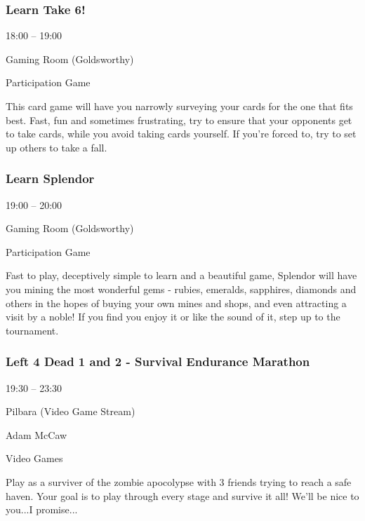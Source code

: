 \documentclass{scrreprt}
\begin{document}
\begin{multicols}{2}
\subsubsection*{Learn Take 6!}\begin{description}
\setlength{\itemsep}{0pt}
\setlength{\parsep}{0pt}
\setlength{\parskip}{0pt}
\item[Time:]{18:00 -- 19:00}
\item[Venue:]{Gaming Room (Goldsworthy)}
\item[Tags:]{Participation Game}\end{description}
This card game will have you narrowly surveying your cards for the one that fits best. Fast, fun and sometimes frustrating, try to ensure that your opponents get to take cards, while you avoid taking cards yourself. If you're forced to, try to set up others to take a fall.
\subsubsection*{Learn Splendor}\begin{description}
\setlength{\itemsep}{0pt}
\setlength{\parsep}{0pt}
\setlength{\parskip}{0pt}
\item[Time:]{19:00 -- 20:00}
\item[Venue:]{Gaming Room (Goldsworthy)}
\item[Tags:]{Participation Game}\end{description}
Fast to play, deceptively simple to learn and a beautiful game, Splendor will have you mining the most wonderful gems - rubies, emeralds, sapphires, diamonds and others in the hopes of buying your own mines and shops, and even attracting a visit by a noble! If you find you enjoy it or like the sound of it, step up to the tournament.
\subsubsection*{Left 4 Dead 1 and 2 - Survival Endurance Marathon}\begin{description}
\setlength{\itemsep}{0pt}
\setlength{\parsep}{0pt}
\setlength{\parskip}{0pt}
\item[Time:]{19:30 -- 23:30}
\item[Venue:]{Pilbara (Video Game Stream)}
\item[People:]{Adam McCaw}
\item[Tags:]{Video Games}\end{description}
Play as a surviver of the zombie apocolypse with 3 friends trying to reach a safe haven. Your goal is to play through every stage and survive it all! We'll be nice to you...I promise...

\end{multicols}
\end{document}
